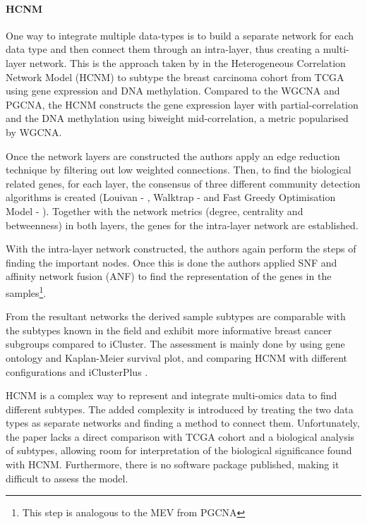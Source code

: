 \paragraph*{HCNM} \label{s:lit:HCNM}

One way to integrate multiple data-types is to build a separate network for each data type and then connect them through an intra-layer, thus creating a multi-layer network. This is the approach taken by \citet{Vangimalla2021-fc} in the Heterogeneous Correlation Network Model (HCNM) to subtype the breast carcinoma cohort from TCGA using gene expression and DNA methylation. Compared to the WGCNA and PGCNA, the HCNM constructs the gene expression layer with partial-correlation and the DNA methylation using biweight mid-correlation, a metric popularised by WGCNA. 

Once the network layers are constructed the authors apply an edge reduction technique by filtering out low weighted connections. Then, to find the biological related genes, for each layer, the consensus of three different community detection algorithms is created (Louivan - \citet{Blondel2008-ik}, Walktrap - \citet{Pons2005-oa} and Fast Greedy Optimisation Model - \cite{Clauset2004-em}). Together with the network metrics (degree, centrality and betweenness) in both layers, the genes for the intra-layer network are established.

With the intra-layer network constructed, the authors again perform the steps of finding the important nodes. Once this is done the authors applied SNF and affinity network fusion (ANF) to find the representation of the genes in the samples\footnote{This step is analogous to the MEV from PGCNA}. 

From the resultant networks the derived sample subtypes are comparable with the subtypes known in the field and exhibit more informative breast cancer subgroups compared to iCluster. The assessment is mainly done by using gene ontology and Kaplan-Meier survival plot, and comparing HCNM with different configurations and iClusterPlus \citep{Mo2013-zi}. 

HCNM is a complex way to represent and integrate multi-omics data to find different subtypes. The added complexity is introduced by treating the two data types as separate networks and finding a method to connect them. Unfortunately, the paper lacks a direct comparison with TCGA cohort and a biological analysis of subtypes, allowing room for interpretation of the biological significance found with HCNM. Furthermore, there is no software package published, making it difficult to assess the model. 

